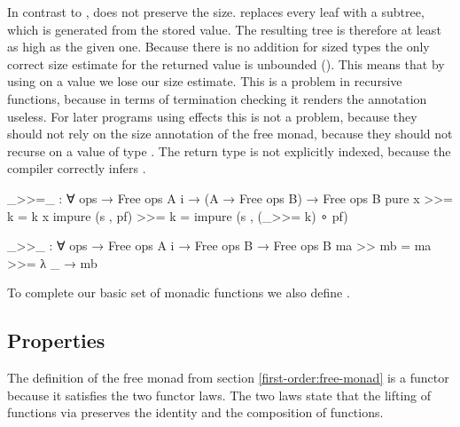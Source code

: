 In contrast to , \AgdaFunction{>>=} does not preserve the
size.
\AgdaFunction{>>=} replaces every  leaf with a
subtree, which is generated from the stored value.
The resulting tree is therefore at least as high as the given one.
Because there is no addition for sized types the only correct size estimate for
the returned value is unbounded ().
This means that by using \AgdaFunction{>>=} on a value we lose our size
estimate.
This is a problem in recursive functions, because in terms of termination
checking it renders the annotation useless.
For later programs using effects this is not a problem, because they should not rely
on the size annotation of the free monad, because they should not recurse on a
value of type .
The return type is not explicitly indexed, because the compiler correctly
infers .

\begin{code}
_>>=_ : ∀ {ops} → Free ops A {i} → (A → Free ops B) → Free ops B
pure x           >>= k = k x
impure (s , pf)  >>= k = impure (s , (_>>= k) ∘ pf)

_>>_ : ∀ {ops} → Free ops A {i} → Free ops B → Free ops B
ma >> mb = ma >>= λ _ → mb
\end{code}
To complete our basic set of monadic functions we also define .


\subsection{Properties}
\label{first-order:free-monad:properties}

The definition of the free monad from section \ref{first-order:free-monad} is a
functor because it satisfies the two functor laws.
The two laws state that the lifting of functions via 
preserves the identity and the composition of functions.


